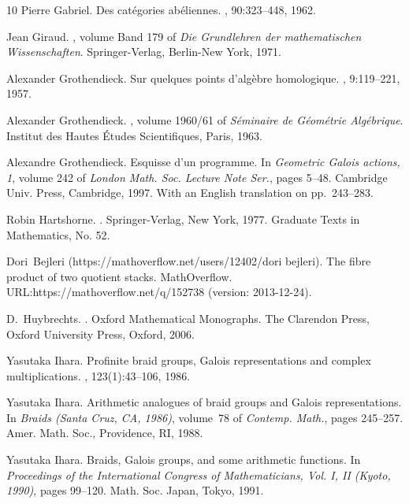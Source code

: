 \documentclass[10pt]{amsart}
\theoremstyle{definition}
\begin{document}
\begin{thebibliography}{10}
Pierre Gabriel.
\newblock Des cat\'egories ab\'eliennes.
, 90:323--448, 1962.

Jean Giraud.
, volume Band 179 of {\em Die
  Grundlehren der mathematischen Wissenschaften}.
\newblock Springer-Verlag, Berlin-New York, 1971.

Alexander Grothendieck.
\newblock Sur quelques points d'alg\`ebre homologique.
, 9:119--221, 1957.

Alexander Grothendieck.
, volume 1960/61 of {\em S\'{e}minaire de
  G\'{e}om\'{e}trie Alg\'{e}brique}.
\newblock Institut des Hautes \'{E}tudes Scientifiques, Paris, 1963.

Alexandre Grothendieck.
\newblock Esquisse d'un programme.
\newblock In {\em Geometric {G}alois actions, 1}, volume 242 of {\em London
  Math. Soc. Lecture Note Ser.}, pages 5--48. Cambridge Univ. Press, Cambridge,
  1997.
\newblock With an English translation on pp.\ 243--283.

Robin Hartshorne.
.
\newblock Springer-Verlag, New York, 1977.
\newblock Graduate Texts in Mathematics, No. 52.

Dori~Bejleri (https://mathoverflow.net/users/12402/dori bejleri).
\newblock The fibre product of two quotient stacks.
\newblock MathOverflow.
\newblock URL:https://mathoverflow.net/q/152738 (version: 2013-12-24).

D.~Huybrechts.
.
\newblock Oxford Mathematical Monographs. The Clarendon Press, Oxford
  University Press, Oxford, 2006.

Yasutaka Ihara.
\newblock Profinite braid groups, {G}alois representations and complex
  multiplications.
, 123(1):43--106, 1986.

Yasutaka Ihara.
\newblock Arithmetic analogues of braid groups and {G}alois representations.
\newblock In {\em Braids ({S}anta {C}ruz, {CA}, 1986)}, volume~78 of {\em
  Contemp. Math.}, pages 245--257. Amer. Math. Soc., Providence, RI, 1988.

Yasutaka Ihara.
\newblock Braids, {G}alois groups, and some arithmetic functions.
\newblock In {\em Proceedings of the {I}nternational {C}ongress of
  {M}athematicians, {V}ol. {I}, {II} ({K}yoto, 1990)}, pages 99--120. Math.
  Soc. Japan, Tokyo, 1991.


\end{thebibliography}
\end{document}
